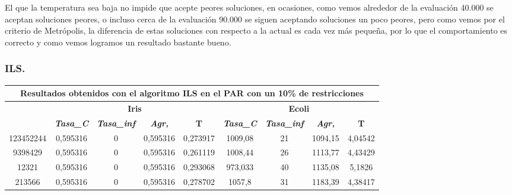 \documentclass[12pt, spanish]{article}
\begin{document}
El que la temperatura sea baja no impide que acepte peores soluciones, en ocasiones, como vemos alrededor de la evaluación 40.000 se aceptan soluciones peores, o incluso cerca de la evaluación 90.000 se siguen aceptando soluciones un poco peores, pero como vemos por el criterio de Metrópolis, la diferencia de estas soluciones con respecto a la actual es cada vez más pequeña, por lo que el comportamiento es correcto y como vemos logramos un resultado bastante bueno.

\subsubsection{ILS.}


\begin{table}[H]
\begin{tabular}{|c|c|c|c|c|c|c|c|c|}
\hline
\multicolumn{9}{|c|}{\textbf{Resultados obtenidos con el algoritmo ILS en el PAR con un 10\% de restricciones}}                                                                                                   \\ \hline
\multirow{2}{*}{} & \multicolumn{4}{c|}{\textbf{Iris}}                                                            & \multicolumn{4}{c|}{\textbf{Ecoli}}                                                           \\ \cline{2-9} 
                  & \textit{\textbf{Tasa\_C}} & \textit{\textbf{Tasa\_inf}} & \textit{\textbf{Agr,}} & \textbf{T} & \textit{\textbf{Tasa\_C}} & \textit{\textbf{Tasa\_inf}} & \textit{\textbf{Agr,}} & \textbf{T} \\ \hline
123452244         & 0,595316                  & 0                           & 0,595316               & 0,273917   & 1009,08                   & 21                          & 1094,15                & 4,04542    \\ \hline
9398429           & 0,595316                  & 0                           & 0,595316               & 0,261119   & 1008,44                   & 26                          & 1113,77                & 4,43429    \\ \hline
12321             & 0,595316                  & 0                           & 0,595316               & 0,293068   & 973,033                   & 40                          & 1135,08                & 5,1826     \\ \hline
213566            & 0,595316                  & 0                           & 0,595316               & 0,278702   & 1057,8                    & 31                          & 1183,39                & 4,38417    \\ \hline

\end{tabular}
\end{table}
\end{document}
